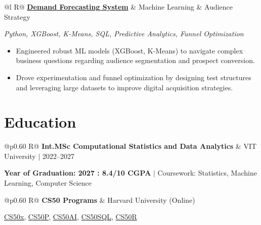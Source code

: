 \documentclass[a4paper,10pt]{article}
\newcommand{\ulink}[2]{\href{#1}{#2}}
\newcommand{\subheading}[1]{{\color[HTML]{0A0A0A}\fontsize{12}{14}\selectfont\bfseries #1}}
\newcommand{\techstack}[1]{{\color[HTML]{5C5C5C}\fontsize{10.5}{12.5}\selectfont\itshape #1}}
\newcommand{\meta}[1]{{\color[HTML]{5C5C5C}\fontsize{10.5}{12.5}\selectfont #1}}
\begin{document}
\begin{tabularx}{\linewidth}{@{}l R@{}}
\subheading{\ulink{https://github.com/su-jin1425/Demand-Forecasting-System}{Demand Forecasting System}} & \meta{Machine Learning \& Audience Strategy}
\end{tabularx}
\techstack{Python, XGBoost, K-Means, SQL, Predictive Analytics, Funnel Optimization}
\begin{itemize}[nosep, leftmargin=1.5em, itemsep=2pt, topsep=2pt]
  \item {\color[HTML]{0A0A0A}\fontsize{11}{14}\selectfont Engineered robust ML models (XGBoost, K-Means) to navigate complex business questions regarding audience segmentation and prospect conversion.}
  \item {\color[HTML]{0A0A0A}\fontsize{11}{14}\selectfont Drove experimentation and funnel optimization by designing test structures and leveraging large datasets to improve digital acquisition strategies.}
\end{itemize}

\section{Education}
\vspace{2pt}

\begin{tabularx}{\linewidth}{@{}p{0.60\linewidth} R@{}}
\subheading{Int.MSc Computational Statistics and Data Analytics} & \meta{VIT University $|$ 2022--2027}
\end{tabularx}
{\color[HTML]{3A3A3A}\fontsize{11}{14}\selectfont \textbf{Year of Graduation: 2027 : 8.4/10 CGPA} $|$ Coursework: Statistics, Machine Learning, Computer Science}

\begin{tabularx}{\linewidth}{@{}p{0.60\linewidth} R@{}}
\subheading{CS50 Programs} & \meta{Harvard University (Online)}
\end{tabularx}
{\color[HTML]{3A3A3A}\fontsize{11}{14}\selectfont \ulink{https://cs50.harvard.edu/certificates/b14b78df-e05c-413e-a607-1dd27303053a}{CS50x}, \ulink{https://cs50.harvard.edu/certificates/32477052-9db4-49c4-a5a4-d7e58429ca2c}{CS50P}, \ulink{https://cs50.harvard.edu/certificates/9cdb4d4a-1250-4f8e-9fd7-191864e0f919}{CS50AI}, \ulink{https://cs50.harvard.edu/certificates/bc486f24-f085-4e61-8536-80940b97a1b9}{CS50SQL}, \ulink{https://cs50.harvard.edu/certificates/666838e6-a053-4d82-b179-a60fe745fd84}{CS50R}}

\end{document}
